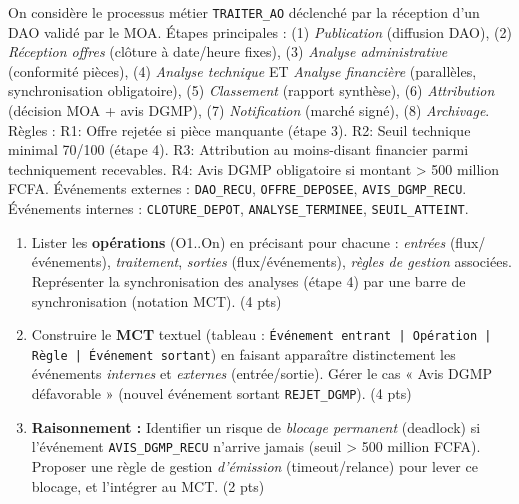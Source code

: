 \documentclass[11pt]{article}
\begin{document}
\begin{exercice}
On considère le processus métier \texttt{TRAITER\_AO} déclenché par la réception d'un DAO validé par le MOA. Étapes principales : (1) \textit{Publication} (diffusion DAO), (2) \textit{Réception offres} (clôture à date/heure fixes), (3) \textit{Analyse administrative} (conformité pièces), (4) \textit{Analyse technique} ET \textit{Analyse financière} (parallèles, synchronisation obligatoire), (5) \textit{Classement} (rapport synthèse), (6) \textit{Attribution} (décision MOA + avis DGMP), (7) \textit{Notification} (marché signé), (8) \textit{Archivage}. Règles : R1: Offre rejetée si pièce manquante (étape 3). R2: Seuil technique minimal 70/100 (étape 4). R3: Attribution au moins-disant financier parmi techniquement recevables. R4: Avis DGMP obligatoire si montant > \num{500} million FCFA. Événements externes : \texttt{DAO\_RECU}, \texttt{OFFRE\_DEPOSEE}, \texttt{AVIS\_DGMP\_RECU}. Événements internes : \texttt{CLOTURE\_DEPOT}, \texttt{ANALYSE\_TERMINEE}, \texttt{SEUIL\_ATTEINT}.
\begin{enumerate}
    \item Lister les \textbf{opérations} (O1..On) en précisant pour chacune : \textit{entrées} (flux/événements), \textit{traitement}, \textit{sorties} (flux/événements), \textit{règles de gestion} associées. Représenter la synchronisation des analyses (étape 4) par une barre de synchronisation (notation MCT). (4 pts)
    \item Construire le \textbf{MCT} textuel (tableau : \texttt{Événement entrant | Opération | Règle | Événement sortant}) en faisant apparaître distinctement les événements \textit{internes} et \textit{externes} (entrée/sortie). Gérer le cas « Avis DGMP défavorable » (nouvel événement sortant \texttt{REJET\_DGMP}). (4 pts)
    \item \textbf{Raisonnement :} Identifier un risque de \textit{blocage permanent} (deadlock) si l'événement \texttt{AVIS\_DGMP\_RECU} n'arrive jamais (seuil > \num{500} million FCFA). Proposer une règle de gestion \textit{d'émission} (timeout/relance) pour lever ce blocage, et l'intégrer au MCT. (2 pts)
\end{enumerate}
\end{exercice}
\end{document}
